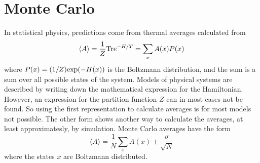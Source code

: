 %

\section{Monte Carlo}
In statistical physics, predictions come from thermal averages calculated from 
\begin{equation}
  \langle A\rangle = \frac{1}{Z}\textrm{Tr} e^{-H/T} = \sum_x A(x) P(x)
\end{equation}
where  $P(x) = (1/Z)\textrm{exp}(-H(x))$ is the Boltzmann distribution, and the sum is a sum over all possible states of the system.
Models of physical systems are described by writing down the mathematical expression for the Hamiltonian. However, an expression for the partition function $Z$ can in most cases not be found. So using the first representation to calculate averages is for most models not possible. The other form shows another way to calculate the averages, at least approximatesly, by simulation. 
Monte Carlo averages have the form 
\begin{equation}
  \langle A \rangle = \frac{1}{N} \sum_x A(x) \pm \frac{\sigma	}{\sqrt N}
\end{equation}
where the states $x$ are Boltzmann distributed.





